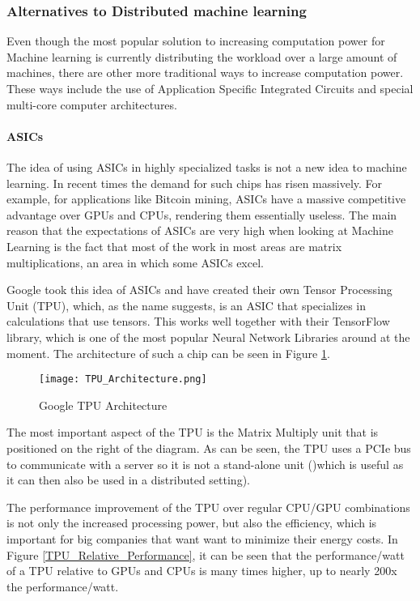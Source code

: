 
\subsubsection{Alternatives to Distributed machine learning}
Even though the most popular solution to increasing computation power for Machine
learning is currently distributing the workload over a large amount of machines,
there are other more traditional ways to increase computation power. These ways
include the use of Application Specific Integrated Circuits and special multi-core
computer architectures.

\paragraph{ASICs}
The idea of using ASICs in highly specialized tasks is not a new idea
to machine learning. In recent times the demand for such chips has risen massively\cite{Metz18}.
For example, for applications like Bitcoin mining, ASICs have a massive competitive
advantage over GPUs and CPUs, rendering them essentially useless. The main reason
that the expectations of ASICs are very high when looking at Machine
Learning is the fact that most of the work in most areas are matrix multiplications,
an area in which some ASICs excel.

Google took this idea of ASICs and have created their own Tensor Processing Unit (TPU)\cite{Sato17},
which, as the name suggests, is an ASIC that specializes in calculations that
use tensors. This works well together with their TensorFlow library, which is one
of the most popular Neural Network Libraries around at the moment. The architecture of
such a chip can be seen in Figure \ref{TPU_Architecture}.

\begin{figure}
  \texttt{[image: TPU\_Architecture.png]}
  \caption{Google TPU Architecture\cite{Joup17}}
  \label{TPU_Architecture}
\end{figure}

The most important aspect of the TPU is the Matrix Multiply unit that is positioned
on the right of the diagram. As can be seen, the TPU uses a PCIe bus to communicate
with a server so it is not a stand-alone unit ()which is useful as it can then also
be used in a distributed setting).

The performance improvement of the TPU over regular CPU/GPU combinations is not only
the increased processing power, but also the efficiency, which is important
for big companies that want want to minimize their energy costs. In Figure \ref{TPU_Relative_Performance},
it can be seen that the performance/watt of a TPU relative to GPUs and CPUs is many times higher,
up to nearly 200x the performance/watt.

